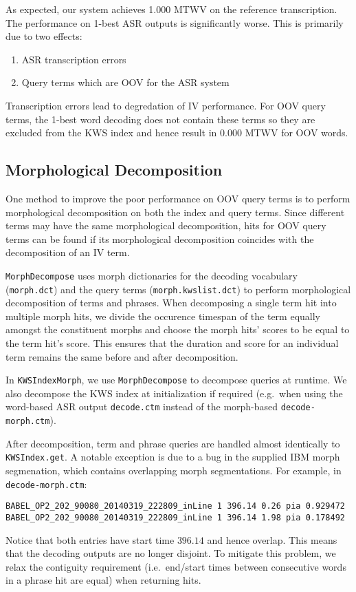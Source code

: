 \documentclass[a4paper,oneside,reqno]{amsart}
\begin{document}
As expected, our system achieves 1.000 MTWV on the reference transcription.
The performance on 1-best ASR outputs is significantly worse. This is primarily
due to two effects:
\begin{enumerate}
  \item ASR transcription errors
  \item Query terms which are OOV for the ASR system
\end{enumerate}
Transcription errors lead to degredation of IV performance. For OOV query terms,
the 1-best word decoding does not contain these terms so they are excluded from the
KWS index and hence result in $0.000$ MTWV for OOV words.

\subsection{Morphological Decomposition}

One method to improve the poor performance on OOV query terms is to perform
morphological decomposition on both the index and query
terms\cite{narasimhan2014morphological}. Since different terms may have the
same morphological decomposition, hits for OOV query terms can be found if its
morphological decomposition coincides with the decomposition of an IV term.

\texttt{MorphDecompose} uses morph dictionaries for the decoding vocabulary
(\texttt{morph.dct}) and the query terms (\texttt{morph.kwslist.dct}) to
perform morphological decomposition of terms and phrases. When decomposing a
single term hit into multiple morph hits, we divide the occurence timespan of
the term equally amongst the constituent morphs and choose the morph hits'
scores to be equal to the term hit's score. This ensures that the duration and
score for an individual term remains the same before and after decomposition.

In \texttt{KWSIndexMorph}, we use \texttt{MorphDecompose} to decompose queries
at runtime.  We also decompose the KWS index at initialization if required
(e.g.\ when using the word-based ASR output \texttt{decode.ctm} instead of the
morph-based \texttt{decode-morph.ctm}).

After decomposition, term and phrase queries are handled almost identically to
\texttt{KWSIndex.get}. A notable exception is due to a bug in the supplied IBM
morph segmenation, which contains overlapping morph segmentations. For example,
in \texttt{decode-morph.ctm}:
\begin{lstlisting}[firstnumber=101748]
BABEL_OP2_202_90080_20140319_222809_inLine 1 396.14 0.26 pia 0.929472
BABEL_OP2_202_90080_20140319_222809_inLine 1 396.14 1.98 pia 0.178492
\end{lstlisting}
Notice that both entries have start time $396.14$ and hence overlap.
This means that the decoding outputs are no longer disjoint. To mitigate
this problem, we relax the contiguity requirement (i.e.\ end/start times between
consecutive words in a phrase hit are equal) when returning hits.
\end{document}
